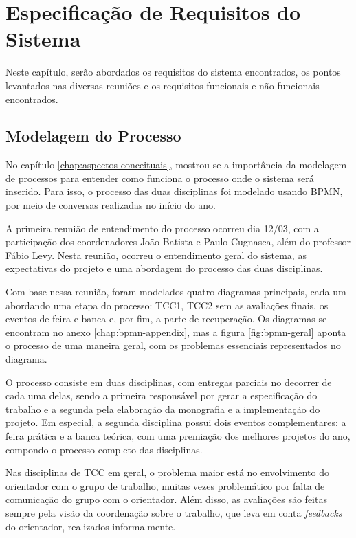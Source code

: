 \chapter{Especificação de Requisitos do Sistema}\label{chap:especificacao-requisitos-sistema}
Neste capítulo, serão abordados os requisitos do sistema encontrados, os pontos levantados nas diversas reuniões e os requisitos funcionais e não funcionais encontrados.

\section{Modelagem do Processo}
No capítulo \ref{chap:aspectos-conceituais}, mostrou-se a importância da modelagem de processos para entender como funciona o processo onde o sistema será inserido. Para isso, o processo das duas disciplinas foi modelado usando BPMN, por meio de conversas realizadas no início do ano.

A primeira reunião de entendimento do processo ocorreu dia 12/03, com a participação dos coordenadores João Batista e Paulo Cugnasca, além do professor Fábio Levy. Nesta reunião, ocorreu o entendimento geral do sistema, as expectativas do projeto e uma abordagem do processo das duas disciplinas.

Com base nessa reunião, foram modelados quatro diagramas principais, cada um abordando uma etapa do processo: TCC1, TCC2 sem as avaliações finais, os eventos de feira e banca e, por fim, a parte de recuperação. Os diagramas se encontram no anexo \ref{chap:bpmn-appendix}, mas a figura \ref{fig:bpmn-geral} aponta o processo de uma maneira geral, com os problemas essenciais representados no diagrama.

O processo consiste em duas disciplinas, com entregas parciais no decorrer de cada uma delas, sendo a primeira responsável por gerar a especificação do trabalho e a segunda pela elaboração da monografia e a implementação do projeto. Em especial, a segunda disciplina possui dois eventos complementares: a feira prática e a banca teórica, com uma premiação dos melhores projetos do ano, compondo o processo completo das disciplinas.

Nas disciplinas de TCC em geral, o problema maior está no envolvimento do orientador com o grupo de trabalho, muitas vezes problemático por falta de comunicação do grupo com o orientador. Além disso, as avaliações são feitas sempre pela visão da coordenação sobre o trabalho, que leva em conta \textit{feedbacks} do orientador, realizados informalmente.


